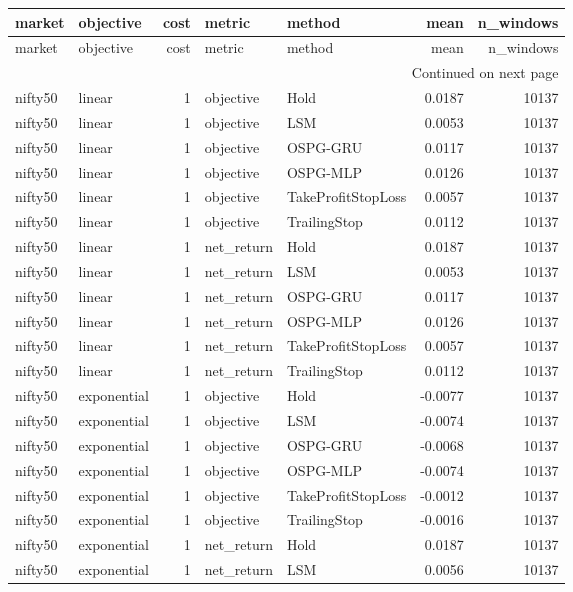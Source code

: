 \begin{longtable}{llrllrr}
\toprule
market & objective & cost & metric & method & mean & n\_windows \\
\midrule
\endfirsthead
\toprule
market & objective & cost & metric & method & mean & n\_windows \\
\midrule
\endhead
\midrule
\multicolumn{7}{r}{Continued on next page} \\
\midrule
\endfoot
\bottomrule
\endlastfoot
nifty50 & linear & 1 & objective & Hold & 0.0187 & 10137 \\
nifty50 & linear & 1 & objective & LSM & 0.0053 & 10137 \\
nifty50 & linear & 1 & objective & OSPG-GRU & 0.0117 & 10137 \\
nifty50 & linear & 1 & objective & OSPG-MLP & 0.0126 & 10137 \\
nifty50 & linear & 1 & objective & TakeProfitStopLoss & 0.0057 & 10137 \\
nifty50 & linear & 1 & objective & TrailingStop & 0.0112 & 10137 \\
nifty50 & linear & 1 & net\_return & Hold & 0.0187 & 10137 \\
nifty50 & linear & 1 & net\_return & LSM & 0.0053 & 10137 \\
nifty50 & linear & 1 & net\_return & OSPG-GRU & 0.0117 & 10137 \\
nifty50 & linear & 1 & net\_return & OSPG-MLP & 0.0126 & 10137 \\
nifty50 & linear & 1 & net\_return & TakeProfitStopLoss & 0.0057 & 10137 \\
nifty50 & linear & 1 & net\_return & TrailingStop & 0.0112 & 10137 \\
nifty50 & exponential & 1 & objective & Hold & -0.0077 & 10137 \\
nifty50 & exponential & 1 & objective & LSM & -0.0074 & 10137 \\
nifty50 & exponential & 1 & objective & OSPG-GRU & -0.0068 & 10137 \\
nifty50 & exponential & 1 & objective & OSPG-MLP & -0.0074 & 10137 \\
nifty50 & exponential & 1 & objective & TakeProfitStopLoss & -0.0012 & 10137 \\
nifty50 & exponential & 1 & objective & TrailingStop & -0.0016 & 10137 \\
nifty50 & exponential & 1 & net\_return & Hold & 0.0187 & 10137 \\
nifty50 & exponential & 1 & net\_return & LSM & 0.0056 & 10137 \\

\end{longtable}
